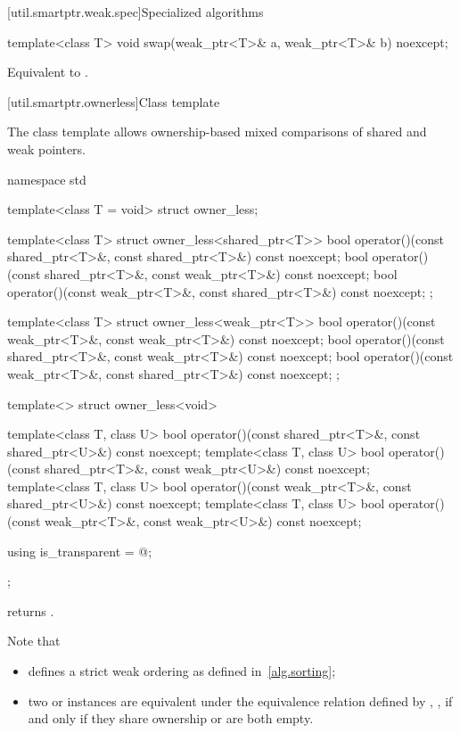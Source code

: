 [util.smartptr.weak.spec]{Specialized algorithms}

%
\begin{itemdecl}
template<class T>
  void swap(weak_ptr<T>& a, weak_ptr<T>& b) noexcept;
\end{itemdecl}

\begin{itemdescr}
\pnum
\effects
Equivalent to .
\end{itemdescr}

[util.smartptr.ownerless]{Class template }

\pnum
The class template  allows ownership-based mixed comparisons of shared
and weak pointers.

%
\begin{codeblock}
namespace std {
  template<class T = void> struct owner_less;

  template<class T> struct owner_less<shared_ptr<T>> {
    bool operator()(const shared_ptr<T>&, const shared_ptr<T>&) const noexcept;
    bool operator()(const shared_ptr<T>&, const weak_ptr<T>&) const noexcept;
    bool operator()(const weak_ptr<T>&, const shared_ptr<T>&) const noexcept;
  };

  template<class T> struct owner_less<weak_ptr<T>> {
    bool operator()(const weak_ptr<T>&, const weak_ptr<T>&) const noexcept;
    bool operator()(const shared_ptr<T>&, const weak_ptr<T>&) const noexcept;
    bool operator()(const weak_ptr<T>&, const shared_ptr<T>&) const noexcept;
  };

  template<> struct owner_less<void> {
    template<class T, class U>
      bool operator()(const shared_ptr<T>&, const shared_ptr<U>&) const noexcept;
    template<class T, class U>
      bool operator()(const shared_ptr<T>&, const weak_ptr<U>&) const noexcept;
    template<class T, class U>
      bool operator()(const weak_ptr<T>&, const shared_ptr<U>&) const noexcept;
    template<class T, class U>
      bool operator()(const weak_ptr<T>&, const weak_ptr<U>&) const noexcept;

    using is_transparent = @\unspec@;
  };
}
\end{codeblock}

%
\pnum
{} returns .
\begin{note}
Note that
\begin{itemize}
\item {} defines a strict weak ordering as defined in~\ref{alg.sorting};

\item
two  or  instances are equivalent
under the equivalence relation defined by ,
,
if and only if they share ownership or are both empty.
\end{itemize}
\end{note}

